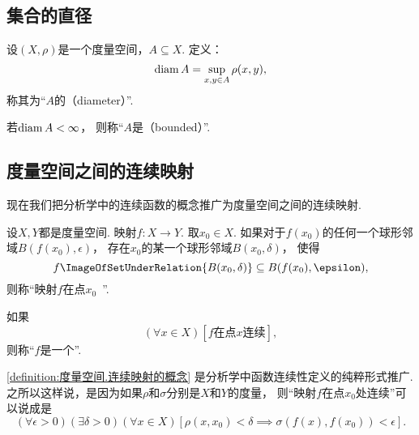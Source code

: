 \subsection{集合的直径}
\begin{definition}
设\((X,\rho)\)是一个度量空间，\(A \subseteq X\).
定义：\[
	\operatorname{diam} A = \sup_{x,y \in A} \rho(x,y),
\]
称其为“\(A\)的（diameter）”.

若\(\operatorname{diam} A < \infty\)，
则称“\(A\)是（bounded）”.
\end{definition}

\subsection{度量空间之间的连续映射}
现在我们把分析学中的连续函数的概念推广为度量空间之间的连续映射.

\begin{definition}\label{definition:度量空间.连续映射的概念}
设\(X,Y\)都是度量空间.
映射\(f\colon X \to Y\).
取\(x_0 \in X\).
如果对于\(f(x_0)\)的任何一个球形邻域\(B(f(x_0),\epsilon)\)，
存在\(x_0\)的某一个球形邻域\(B(x_0,\delta)\)，
使得\[
	f\ImageOfSetUnderRelation{B(x_0,\delta)}
	\subseteq
	B(f(x_0),\epsilon),
\]
则称“映射\(f\)在点\(x_0\)~”.

如果\[
	(\forall x \in X)
	[\text{\(f\)在点\(x\)连续}],
\]
则称“\(f\)是一个”.
\end{definition}
\cref{definition:度量空间.连续映射的概念} 是分析学中函数连续性定义的纯粹形式推广.
之所以这样说，是因为如果\(\rho\)和\(\sigma\)分别是\(X\)和\(Y\)的度量，
则“映射\(f\)在点\(x_0\)处连续”可以说成是\[
	(\forall\epsilon>0)
	(\exists\delta>0)
	(\forall x \in X)
	[
		\rho(x,x_0)<\delta
		\implies
		\sigma(f(x),f(x_0))<\epsilon
	].
\]

